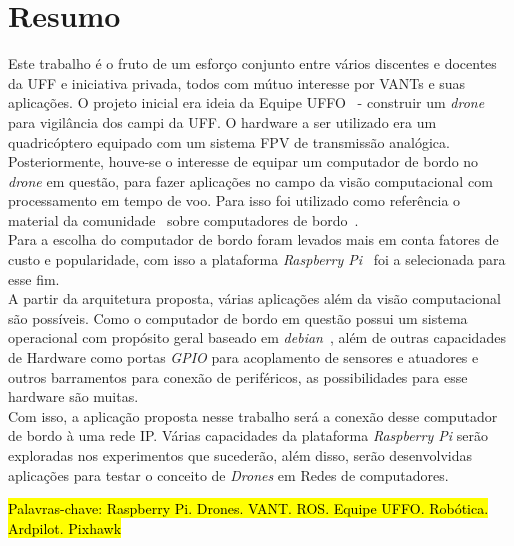 \documentclass[12pt,a4paper,oneside]{book}
\begin{document}
\pagebreak




\chapter*{Resumo}
%
%
\thispagestyle{myheadings}
%
Este trabalho é o fruto de um esforço conjunto entre vários discentes e docentes da UFF e iniciativa privada, todos com mútuo 
interesse por VANTs e suas aplicações. O projeto inicial era ideia da Equipe UFFO~\cite{url:equipeuffo} - construir um \textit{drone} 
para vigilância dos campi da UFF. O hardware a ser utilizado era um quadricóptero equipado com um sistema FPV de transmissão analógica. 
Posteriormente, houve-se o interesse de equipar um computador de bordo no \textit{drone} em questão, para fazer aplicações no campo 
da visão computacional com processamento em tempo de voo. Para isso foi utilizado como referência o material da comunidade~\cite{url:ardupilotdoc} 
sobre computadores de bordo~\cite{url:ardupilot-companioncomputers}.\\
%
Para a escolha do computador de bordo foram levados mais em conta fatores de custo e popularidade, com isso a plataforma 
\textit{Raspberry Pi}~\cite{url:raspberrypi} foi a selecionada para esse fim.\\
%
A partir da arquitetura proposta, várias aplicações além da visão computacional são possíveis. Como o computador de bordo em questão 
possui um sistema operacional com propósito geral baseado em \textit{debian}~\cite{url:debian}, além de outras capacidades de Hardware como portas 
\textit{GPIO} para acoplamento de sensores e atuadores e outros barramentos para conexão de periféricos, as possibilidades para esse hardware são muitas.\\
%
Com isso, a aplicação proposta nesse trabalho será a conexão desse computador de bordo à uma rede IP. Várias capacidades da plataforma 
\textit{Raspberry Pi} serão exploradas nos experimentos que sucederão, além disso, serão desenvolvidas aplicações para testar o conceito de 
\textit{Drones} em Redes de computadores.
%

\bigskip

\hl{ Palavras-chave: Raspberry Pi. Drones. VANT. ROS. Equipe UFFO. Robótica. Ardpilot. Pixhawk}
\end{document}
